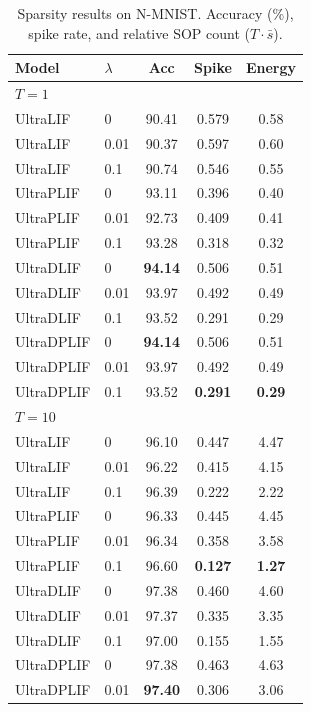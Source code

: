 \documentclass{article}
\theoremstyle{plain}
\theoremstyle{definition}
\theoremstyle{remark}
\begin{document}
\begin{table}[h]
\caption{Sparsity results on N-MNIST. Accuracy (\%), spike rate, and relative SOP count ($T \cdot \bar{s}$).}
\label{tab:sparsity_nmnist}
\vskip 0.1in
\begin{center}
\begin{small}
\begin{tabular}{llccc}
\toprule
Model & $\lambda$ & Acc & Spike & Energy \\
\midrule
\multicolumn{5}{l}{\textit{$T{=}1$}} \\
UltraLIF   & 0    & 90.41 & 0.579 & 0.58 \\
UltraLIF   & 0.01 & 90.37 & 0.597 & 0.60 \\
UltraLIF   & 0.1  & 90.74 & 0.546 & 0.55 \\
UltraPLIF  & 0    & 93.11 & 0.396 & 0.40 \\
UltraPLIF  & 0.01 & 92.73 & 0.409 & 0.41 \\
UltraPLIF  & 0.1  & 93.28 & 0.318 & 0.32 \\
UltraDLIF  & 0    & \textbf{94.14} & 0.506 & 0.51 \\
UltraDLIF  & 0.01 & 93.97 & 0.492 & 0.49 \\
UltraDLIF  & 0.1  & 93.52 & 0.291 & 0.29 \\
UltraDPLIF & 0    & \textbf{94.14} & 0.506 & 0.51 \\
UltraDPLIF & 0.01 & 93.97 & 0.492 & 0.49 \\
UltraDPLIF & 0.1  & 93.52 & \textbf{0.291} & \textbf{0.29} \\
\midrule
\multicolumn{5}{l}{\textit{$T{=}10$}} \\
UltraLIF   & 0    & 96.10 & 0.447 & 4.47 \\
UltraLIF   & 0.01 & 96.22 & 0.415 & 4.15 \\
UltraLIF   & 0.1  & 96.39 & 0.222 & 2.22 \\
UltraPLIF  & 0    & 96.33 & 0.445 & 4.45 \\
UltraPLIF  & 0.01 & 96.34 & 0.358 & 3.58 \\
UltraPLIF  & 0.1  & 96.60 & \textbf{0.127} & \textbf{1.27} \\
UltraDLIF  & 0    & 97.38 & 0.460 & 4.60 \\
UltraDLIF  & 0.01 & 97.37 & 0.335 & 3.35 \\
UltraDLIF  & 0.1  & 97.00 & 0.155 & 1.55 \\
UltraDPLIF & 0    & 97.38 & 0.463 & 4.63 \\
UltraDPLIF & 0.01 & \textbf{97.40} & 0.306 & 3.06 \\

\end{tabular}
\end{small}
\end{center}
\end{table}
\end{document}
